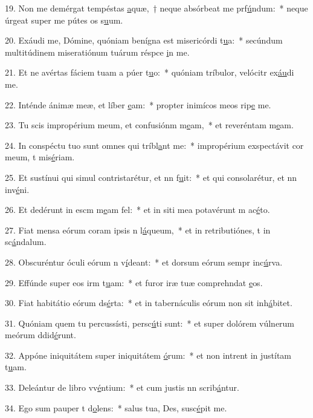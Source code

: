 19. Non me demérgat tempéstas \uline{a}quæ,~† neque absórbeat me prf\uline{ú}ndum:~* neque úrgeat super me pútes os s\uline{u}um.\par 
20. Exáudi me, Dómine, quóniam benígna est misericórdi t\uline{u}a:~* secúndum multitúdinem miseratiónum tuárum réspce \uline{i}n me.\par 
21. Et ne avértas fáciem tuam a púer t\uline{u}o:~* quóniam tríbulor, velócitr ex\uline{áu}di me.\par 
22. Inténde ánimæ meæ, et líber \uline{e}am:~* propter inimícos meos rip\uline{e} me.\par 
23. Tu scis impropérium meum, et confusiónm m\uline{e}am,~* et reveréntam m\uline{e}am.\par 
24. In conspéctu tuo sunt omnes qui tríbl\uline{a}nt me:~* impropérium exspectávit cor meum, t mis\uline{é}riam.\par 
25. Et sustínui qui simul contristarétur, et nn f\uline{u}it:~* et qui consolarétur, et nn inv\uline{é}ni.\par 
26. Et dedérunt in escm m\uline{e}am fel:~* et in siti mea potavérunt m ac\uline{é}to.\par 
27. Fiat mensa eórum coram ipsis n l\uline{á}queum,~* et in retributiónes, t in sc\uline{á}ndalum.\par 
28. Obscuréntur óculi eórum n v\uline{í}deant:~* et dorsum eórum sempr inc\uline{ú}rva.\par 
29. Effúnde super eos irm t\uline{u}am:~* et furor iræ tuæ comprehndat \uline{e}os.\par 
30. Fiat habitátio eórum ds\uline{é}rta:~* et in tabernáculis eórum non sit  inh\uline{á}bitet.\par 
31. Quóniam quem tu percussísti, persc\uline{ú}ti sunt:~* et super dolórem vúlnerum meórum ddid\uline{é}runt.\par 
32. Appóne iniquitátem super iniquitátem \uline{ó}rum:~* et non intrent in justítam t\uline{u}am.\par 
33. Deleántur de libro vv\uline{é}ntium:~* et cum justis nn scrib\uline{á}ntur.\par 
34. Ego sum pauper t d\uline{o}lens:~* salus tua, Des, susc\uline{é}pit me.\par 
